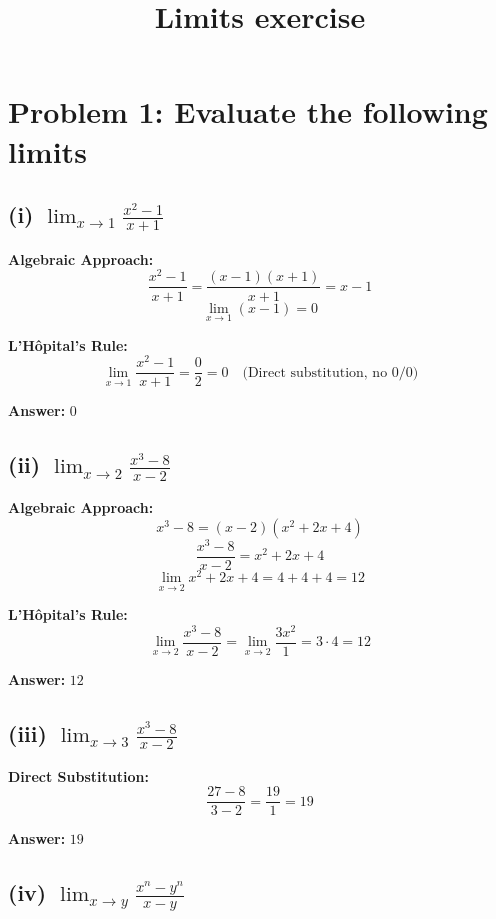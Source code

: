 \documentclass[12pt]{article}
\title{Limits exercise}
\author{}
\date{}
\begin{document}
\maketitle

\section*{Problem 1: Evaluate the following limits}

\subsection*{(i) \(\displaystyle \lim_{x \to 1} \frac{x^2 - 1}{x + 1}\)}

\textbf{Algebraic Approach:}
\[
\frac{x^2 - 1}{x + 1} = \frac{(x - 1)(x + 1)}{x + 1} = x - 1
\]
\[
\lim_{x \to 1} (x - 1) = 0
\]

\textbf{L'Hôpital's Rule:}
\[
\lim_{x \to 1} \frac{x^2 - 1}{x + 1} = \frac{0}{2} = 0 \quad \text{(Direct substitution, no 0/0)}
\]

\textbf{Answer:} \(\boxed{0}\)

\subsection*{(ii) \(\displaystyle \lim_{x \to 2} \frac{x^3 - 8}{x - 2}\)}

\textbf{Algebraic Approach:}
\[
x^3 - 8 = (x - 2)(x^2 + 2x + 4)
\]
\[
\frac{x^3 - 8}{x - 2} = x^2 + 2x + 4
\]
\[
\lim_{x \to 2} x^2 + 2x + 4 = 4 + 4 + 4 = 12
\]

\textbf{L'Hôpital's Rule:}
\[
\lim_{x \to 2} \frac{x^3 - 8}{x - 2} = \lim_{x \to 2} \frac{3x^2}{1} = 3 \cdot 4 = 12
\]

\textbf{Answer:} \(\boxed{12}\)

\subsection*{(iii) \(\displaystyle \lim_{x \to 3} \frac{x^3 - 8}{x - 2}\)}

\textbf{Direct Substitution:}
\[
\frac{27 - 8}{3 - 2} = \frac{19}{1} = 19
\]

\textbf{Answer:} \(\boxed{19}\)

\subsection*{(iv) \(\displaystyle \lim_{x \to y} \frac{x^n - y^n}{x - y}\)}
\end{document}
